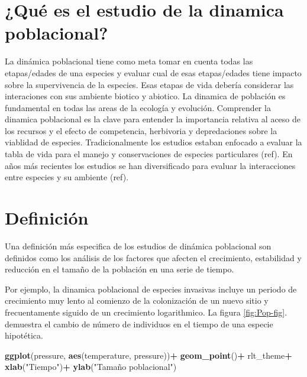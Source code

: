 \documentclass[
]{book}
\newenvironment{Shaded}{\begin{snugshade}}{\end{snugshade}}
\newcommand{\FunctionTok}[1]{\textcolor[rgb]{0.13,0.29,0.53}{\textbf{#1}}}
\newcommand{\NormalTok}[1]{#1}
\newcommand{\SpecialCharTok}[1]{\textcolor[rgb]{0.81,0.36,0.00}{\textbf{#1}}}
\newcommand{\StringTok}[1]{\textcolor[rgb]{0.31,0.60,0.02}{#1}}
\theoremstyle{definition}
\theoremstyle{definition}
\theoremstyle{definition}
\theoremstyle{definition}
\theoremstyle{remark}
\begin{document}
\hypertarget{quuxe9-es-el-estudio-de-la-dinamica-poblacional}{%
\section{¿Qué es el estudio de la dinamica poblacional?}\label{quuxe9-es-el-estudio-de-la-dinamica-poblacional}}

La dinámica poblacional tiene como meta tomar en cuenta todas las etapas/edades de una especies y evaluar cual de esas etapas/edades tiene impacto sobre la supervivencia de la especies. Esas etapas de vida debería considerar las interaciones con sus ambiente biotico y abiotico. La dinamica de población es fundamental en todas las areas de la ecología y evolución. Comprender la dinamica poblacional es la clave para entender la importancia relativa al aceso de los recursos y el efecto de competencia, herbivoria y depredaciones sobre la viablidad de especies. Tradicionalmente los estudios estaban enfocado a evaluar la tabla de vida para el manejo y conservaciones de especies particulares (ref). En años más recientes los estudios se han diversificado para evaluar la interacciones entre especies y su ambiente (ref).

\hypertarget{definiciuxf3n}{%
\section{Definición}\label{definiciuxf3n}}

Una definición más especifica de los estudios de dinámica poblacional son definidos como los análisis de los factores que afecten el crecimiento, estabilidad y reducción en el tamaño de la población en una serie de tiempo.

Por ejemplo, la dinamica poblacional de especies invasivas incluye un periodo de crecimiento muy lento al comienzo de la colonización de un nuevo sitio y frecuentamente siguido de un crecimiento logarithmico. La figura \ref{fig:Pop-fig}. demuestra el cambio de número de individuos en el tiempo de una especie hipotética.

\begin{Shaded}
\begin{Highlighting}[]
\FunctionTok{ggplot}\NormalTok{(pressure, }\FunctionTok{aes}\NormalTok{(temperature, pressure))}\SpecialCharTok{+}
  \FunctionTok{geom\_point}\NormalTok{()}\SpecialCharTok{+}
\NormalTok{  rlt\_theme}\SpecialCharTok{+}
  \FunctionTok{xlab}\NormalTok{(}\StringTok{"Tiempo"}\NormalTok{)}\SpecialCharTok{+}
  \FunctionTok{ylab}\NormalTok{(}\StringTok{"Tamaño poblacional"}\NormalTok{)}
\end{Highlighting}
\end{Shaded}
\end{document}
